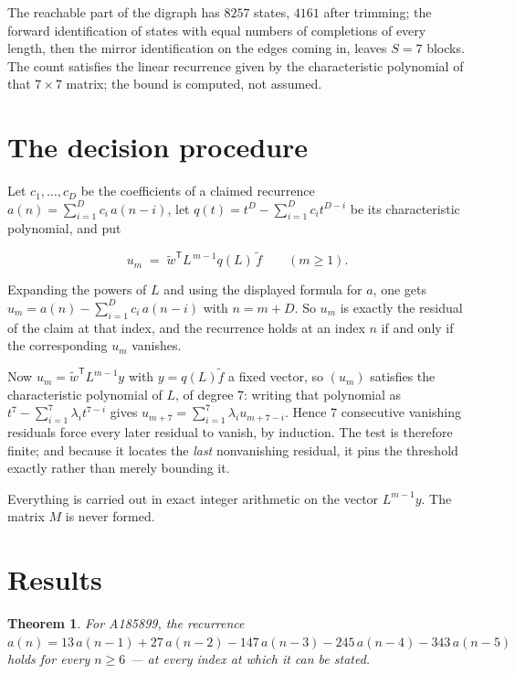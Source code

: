 \documentclass[11pt]{article}
\newtheorem{theorem}{Theorem}
\theoremstyle{definition}
\begin{document}
The reachable part of the digraph has $8257$ states, $4161$ after trimming; the forward identification of states with equal numbers of completions of every length, then the mirror identification on the edges coming in, leaves $S = 7$ blocks. The count satisfies the linear recurrence given by the characteristic polynomial of that $7\times7$ matrix; the bound is computed, not assumed.

\section{The decision procedure}

Let $c_1,\dots,c_D$ be the coefficients of a claimed recurrence $a(n) = \sum_{i=1}^{D} c_i\,a(n-i)$, let $q(t) = t^{D} - \sum_{i=1}^{D} c_i t^{D-i}$ be its characteristic polynomial, and put

\[u_m \;=\; \tilde w^{\mathsf T} L^{\,m-1} q(L)\,\tilde f \qquad (m \ge 1).\]

Expanding the powers of $L$ and using the displayed formula for $a$, one gets $u_m = a(n) - \sum_{i=1}^{D} c_i\,a(n-i)$ with $n = m + D$. So $u_m$ is exactly the residual of the claim at that index, and the recurrence holds at an index $n$ if and only if the corresponding $u_m$ vanishes.

Now $u_m = \tilde w^{\mathsf T} L^{m-1} y$ with $y = q(L)\tilde f$ a fixed vector, so $(u_m)$ satisfies the characteristic polynomial of $L$, of degree $7$: writing that polynomial as $t^{7} - \sum_{i=1}^{7} \lambda_i t^{7-i}$ gives $u_{m+7} = \sum_{i=1}^{7} \lambda_i u_{m+7-i}$. Hence $7$ consecutive vanishing residuals force every later residual to vanish, by induction. The test is therefore finite; and because it locates the {\itshape last} nonvanishing residual, it pins the threshold exactly rather than merely bounding it.

Everything is carried out in exact integer arithmetic on the vector $L^{m-1}y$. The matrix $M$ is never formed.

\section{Results}

\begin{theorem} For A185899, the recurrence $a(n) = 13\,a(n-1) + 27\,a(n-2) - 147\,a(n-3) - 245\,a(n-4) - 343\,a(n-5)$ holds for every $n \ge 6$ --- at every index at which it can be stated.\end{theorem}
\end{document}
